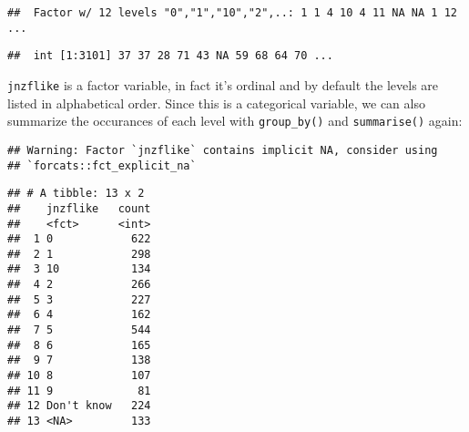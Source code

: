 \documentclass[]{article}
\newenvironment{Shaded}{\begin{snugshade}}{\end{snugshade}}
\newcommand{\KeywordTok}[1]{\textcolor[rgb]{0.13,0.29,0.53}{\textbf{#1}}}
\newcommand{\DataTypeTok}[1]{\textcolor[rgb]{0.13,0.29,0.53}{#1}}
\newcommand{\StringTok}[1]{\textcolor[rgb]{0.31,0.60,0.02}{#1}}
\newcommand{\OperatorTok}[1]{\textcolor[rgb]{0.81,0.36,0.00}{\textbf{#1}}}
\newcommand{\NormalTok}[1]{#1}
\begin{document}
\begin{Shaded}
\end{Shaded}

\begin{verbatim}
##  Factor w/ 12 levels "0","1","10","2",..: 1 1 4 10 4 11 NA NA 1 12 ...
\end{verbatim}

\begin{Shaded}
\end{Shaded}

\begin{verbatim}
##  int [1:3101] 37 37 28 71 43 NA 59 68 64 70 ...
\end{verbatim}

\texttt{jnzflike} is a factor variable, in fact it's ordinal and by
default the levels are listed in alphabetical order. Since this is a
categorical variable, we can also summarize the occurances of each level
with \texttt{group\_by()} and \texttt{summarise()} again:

\begin{Shaded}
\end{Shaded}

\begin{verbatim}
## Warning: Factor `jnzflike` contains implicit NA, consider using
## `forcats::fct_explicit_na`
\end{verbatim}

\begin{verbatim}
## # A tibble: 13 x 2
##    jnzflike   count
##    <fct>      <int>
##  1 0            622
##  2 1            298
##  3 10           134
##  4 2            266
##  5 3            227
##  6 4            162
##  7 5            544
##  8 6            165
##  9 7            138
## 10 8            107
## 11 9             81
## 12 Don't know   224
## 13 <NA>         133
\end{verbatim}
\end{document}
